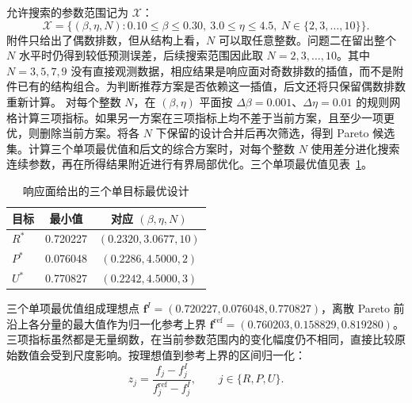 \documentclass[withoutpreface,bwprint]{cumcmthesis}
\newcommand{\Rstar}{R^{*}}
\newcommand{\Pstar}{P^{*}}
\newcommand{\Ustar}{U^{*}}
\newcommand{\vect}[1]{\bm{#1}}
\begin{document}
允许搜索的参数范围记为 $\mathcal X$：
\begin{equation}
\mathcal X=\{(\beta,\eta,N):0.10\leq\beta\leq0.30,
\ 3.0\leq\eta\leq4.5,
\ N\in\{2,3,\ldots,10\}\}.
\end{equation}
附件只给出了偶数排数，但从结构上看，$N$ 可以取任意整数。问题二在留出整个 $N$ 水平时仍得到较低预测误差，后续搜索范围因此取 $N=2,3,\ldots,10$。其中 $N=3,5,7,9$ 没有直接观测数据，相应结果是响应面对奇数排数的插值，而不是附件已有的结构组合。为判断推荐方案是否依赖这一插值，后文还将只保留偶数排数重新计算。
对每个整数 $N$，在 $(\beta,\eta)$ 平面按 $\Delta\beta=0.001$、$\Delta\eta=0.01$ 的规则网格计算三项指标。如果另一方案在三项指标上均不差于当前方案，且至少一项更优，则删除当前方案。将各 $N$ 下保留的设计合并后再次筛选，得到 Pareto 候选集。计算三个单项最优值和后文的综合方案时，对每个整数 $N$ 使用差分进化搜索连续参数，再在所得结果附近进行有界局部优化。三个单项最优值见表~\ref{tab:ideal-designs}。
\begin{table}[H]
\centering
\caption{响应面给出的三个单目标最优设计}
\label{tab:ideal-designs}
\begin{tabular}{lcc}
\toprule
目标 & 最小值 & 对应 $(\beta,\eta,N)$\\
\midrule
$\Rstar$ & 0.720227 & $(0.2320,3.0677,10)$\\
$\Pstar$ & 0.076048 & $(0.2286,4.5000,2)$\\
$\Ustar$ & 0.770827 & $(0.2242,4.5000,3)$\\
\bottomrule
\end{tabular}
\end{table}
三个单项最优值组成理想点 $\vect f^I=(0.720227,0.076048,0.770827)$，离散 Pareto 前沿上各分量的最大值作为归一化参考上界 $\vect f^{\mathrm{ref}}=(0.760203,0.158829,0.819280)$。三项指标虽然都是无量纲数，在当前参数范围内的变化幅度仍不相同，直接比较原始数值会受到尺度影响。按理想值到参考上界的区间归一化：
\begin{equation}
z_j=\frac{f_j-f_j^I}{f_j^{\mathrm{ref}}-f_j^I},\qquad j\in\{R,P,U\}.
\label{eq:q3-normalization}
\end{equation}
\end{document}
